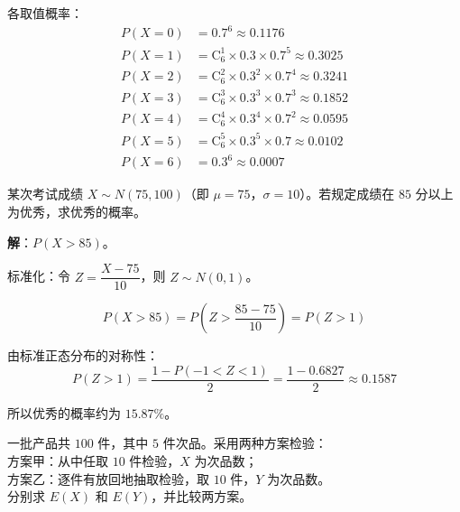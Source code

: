 \documentclass[12pt, a4paper]{ctexart}
\begin{document}
各取值概率：
\begin{align*}
P(X=0) &= 0.7^6 \approx 0.1176 \\
P(X=1) &= \mathrm{C}_6^1 \times 0.3 \times 0.7^5 \approx 0.3025 \\
P(X=2) &= \mathrm{C}_6^2 \times 0.3^2 \times 0.7^4 \approx 0.3241 \\
P(X=3) &= \mathrm{C}_6^3 \times 0.3^3 \times 0.7^3 \approx 0.1852 \\
P(X=4) &= \mathrm{C}_6^4 \times 0.3^4 \times 0.7^2 \approx 0.0595 \\
P(X=5) &= \mathrm{C}_6^5 \times 0.3^5 \times 0.7 \approx 0.0102 \\
P(X=6) &= 0.3^6 \approx 0.0007
\end{align*}

\begin{center}
\end{center}

\begin{examplebox}[【例6】正态分布标准化与概率计算]
某次考试成绩 $X \sim N(75, 100)$（即 $\mu=75$，$\sigma=10$）。若规定成绩在 $85$ 分以上为优秀，求优秀的概率。
\end{examplebox}

\textbf{解}：$P(X > 85)$。

标准化：令 $Z = \dfrac{X - 75}{10}$，则 $Z \sim N(0, 1)$。

\[
P(X > 85) = P\left(Z > \frac{85 - 75}{10}\right) = P(Z > 1)
\]

由标准正态分布的对称性：
\[
P(Z > 1) = \frac{1 - P(-1 < Z < 1)}{2} = \frac{1 - 0.6827}{2} \approx 0.1587
\]

所以优秀的概率约为 $15.87\%$。

\begin{examplebox}
一批产品共 $100$ 件，其中 $5$ 件次品。采用两种方案检验：\\
方案甲：从中任取 $10$ 件检验，$X$ 为次品数；\\
方案乙：逐件有放回地抽取检验，取 $10$ 件，$Y$ 为次品数。\\
分别求 $E(X)$ 和 $E(Y)$，并比较两方案。
\end{examplebox}
\end{document}
